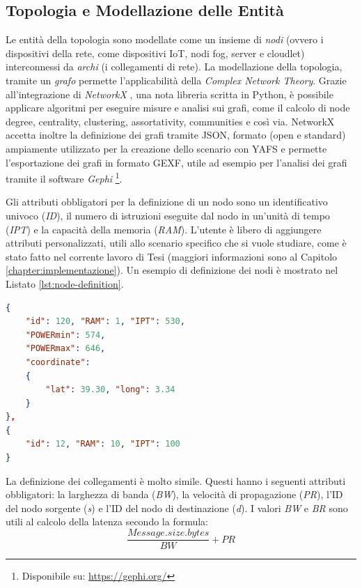 \subsection{Topologia e Modellazione delle Entità}

Le entità della topologia sono modellate come un insieme di \textit{nodi} (ovvero i dispositivi della rete, come dispositivi IoT, nodi fog, server e cloudlet) interconnessi da \textit{archi} (i collegamenti di rete). La modellazione della topologia, tramite un \textit{grafo} permette l'applicabilità della \textit{Complex Network Theory}. Grazie all'integrazione di \textit{NetworkX}  \cite{NetworkX}, una nota libreria scritta in Python, è possibile applicare algoritmi per eseguire misure e analisi sui grafi, come il calcolo di node degree, centrality, clustering, assortativity, communities e così via. NetworkX accetta inoltre la definizione dei grafi tramite JSON, formato (open e standard) ampiamente utilizzato per la creazione dello scenario con YAFS e permette l'esportazione dei grafi in formato GEXF, utile ad esempio per l'analisi dei grafi tramite il software \textit{Gephi} \footnote{Disponibile su: \url{https://gephi.org/}}.

Gli attributi obbligatori per la definizione di un nodo sono un identificativo univoco (\textit{ID}), il numero di istruzioni eseguite dal nodo in un'unità di tempo (\textit{IPT}) e la capacità della memoria (\textit{RAM}). L'utente è libero di aggiungere attributi personalizzati, utili allo scenario specifico che si vuole studiare, come è stato fatto nel corrente lavoro di Tesi (maggiori informazioni sono al Capitolo \ref{chapter:implementazione}). Un esempio di definizione dei nodi è mostrato nel Listato \ref{lst:node-definition}. 
\begin{lstlisting}[language=json, caption={Definizione di due nodi Fog utilizzando la rappresentazione JSON \cite{YAFSSimulator}}, captionpos=b, label={lst:node-definition}]
{
    "id": 120, "RAM": 1, "IPT": 530,
    "POWERmin": 574,
    "POWERmax": 646,
    "coordinate": 
    {
        "lat": 39.30, "long": 3.34
    }
},
{
    "id": 12, "RAM": 10, "IPT": 100
}
\end{lstlisting}

La definizione dei collegamenti è molto simile. Questi hanno i seguenti attributi obbligatori: la larghezza di banda (\textit{BW}), la velocità di propagazione (\textit{PR}), l'ID del nodo sorgente (\textit{s}) e l'ID del nodo di destinazione (\textit{d}). I valori \textit{BW} e \textit{BR} sono utili al calcolo della latenza secondo la formula:
$$\frac{Message.size.bytes}{BW} + PR$$

